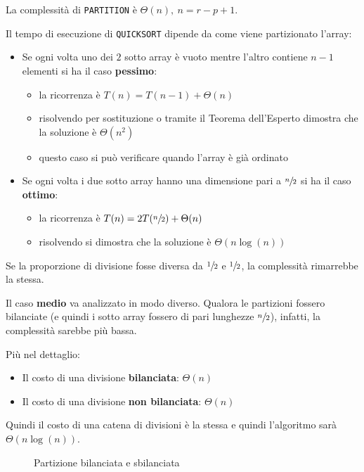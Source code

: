 \documentclass[italian, 10pt]{article}
\begin{document}
La complessità di \texttt{PARTITION} è \(\Theta(n),\ n = r - p + 1\).

\bigskip
Il tempo di esecuzione di \texttt{QUICKSORT} dipende da come viene partizionato l'array:

\begin{itemize}
  \item Se ogni volta uno dei \(2\) sotto array è vuoto mentre l'altro contiene \(n-1\) elementi si ha il caso \textbf{pessimo}:
        \begin{itemize}
          \item la ricorrenza è \(T(n) = T(n - 1) + \Theta(n)\)
          \item risolvendo per sostituzione o tramite il Teorema dell'Esperto dimostra che la soluzione è \(\Theta(n^2)\)
          \item questo caso si può verificare quando l'array è già ordinato
        \end{itemize}
  \item Se ogni volta i due sotto array hanno una dimensione pari a \(\sfrac{n}{2}\) si ha il caso \textbf{ottimo}:
        \begin{itemize}
          \item la ricorrenza è \(T(n) = 2T(\sfrac{n}{2}) + \Theta(n)\)
          \item risolvendo si dimostra che la soluzione è \(\Theta(n \log{(n)})\)
        \end{itemize}
\end{itemize}

Se la proporzione di divisione fosse diversa da \(\sfrac{1}{2}\) e \(\sfrac{1}{2}\), la complessità rimarrebbe la stessa.

\bigskip
Il caso \textbf{medio} va analizzato in modo diverso.
Qualora le partizioni fossero bilanciate (e quindi i sotto array fossero di pari lunghezze \(\sfrac{n}{2}\)), infatti, la complessità sarebbe più bassa.

Più nel dettaglio:

\begin{itemize}
  \item Il costo di una divisione \textbf{bilanciata}: \(\Theta(n)\)
  \item Il costo di una divisione \textbf{non bilanciata}: \(\Theta(n)\)
\end{itemize}

Quindi il costo di una catena di divisioni è la stessa e quindi l'algoritmo sarà \(\Theta(n \log{(n)})\).

\begin{figure}[htbp]
  \bigskip
  \centering
  \caption{Partizione bilanciata e sbilanciata}
  \label{fig:partizione-bilanciata-sbilanciata}
  \bigskip
\end{figure}
\end{document}
